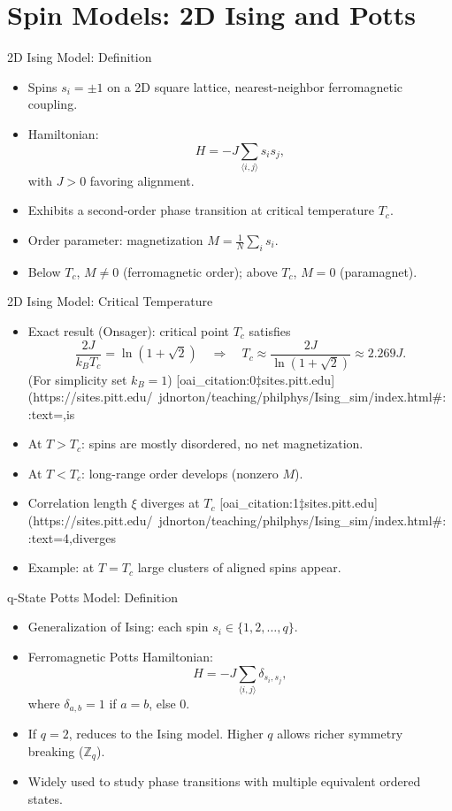 \documentclass{beamer}
\begin{document}
\section{Spin Models: 2D Ising and Potts}

\begin{frame}{2D Ising Model: Definition}
 \begin{itemize}
   \item Spins $s_i = \pm 1$ on a 2D square lattice, nearest-neighbor ferromagnetic coupling.
   \item Hamiltonian:
     \[
       H = -J \sum_{\langle i,j\rangle} s_i s_j,
     \]
     with $J>0$ favoring alignment.
   \item Exhibits a second-order phase transition at critical temperature $T_c$.
   \item Order parameter: magnetization $M = \frac{1}{N}\sum_i s_i$.
   \item Below $T_c$, $M\neq0$ (ferromagnetic order); above $T_c$, $M=0$ (paramagnet).
 \end{itemize}
\end{frame}

\begin{frame}{2D Ising Model: Critical Temperature}
 \begin{itemize}
   \item Exact result (Onsager): critical point $T_c$ satisfies
     \[
       \frac{2J}{k_B T_c} = \ln(1+\sqrt{2}) \quad\Rightarrow\quad T_c \approx \frac{2J}{\ln(1+\sqrt{2})}\approx 2.269J.
     \]
     (For simplicity set $k_B=1$) [oai_citation:0‡sites.pitt.edu](https://sites.pitt.edu/~jdnorton/teaching/philphys/Ising_sim/index.html#:~:text=,is%
   \item At $T>T_c$: spins are mostly disordered, no net magnetization.
   \item At $T<T_c$: long-range order develops (nonzero $M$).
   \item Correlation length $\xi$ diverges at $T_c$ [oai_citation:1‡sites.pitt.edu](https://sites.pitt.edu/~jdnorton/teaching/philphys/Ising_sim/index.html#:~:text=4,diverges%
   \item Example: at $T=T_c$ large clusters of aligned spins appear.
 \end{itemize}
\end{frame}

\begin{frame}{q-State Potts Model: Definition}
 \begin{itemize}
   \item Generalization of Ising: each spin $s_i \in \{1,2,\dots,q\}$.
   \item Ferromagnetic Potts Hamiltonian:
     \[
       H = -J \sum_{\langle i,j\rangle} \delta_{s_i,s_j},
     \]
     where $\delta_{a,b}=1$ if $a=b$, else $0$.
   \item If $q=2$, reduces to the Ising model. Higher $q$ allows richer symmetry breaking ($\mathbb{Z}_q$).
   \item Widely used to study phase transitions with multiple equivalent ordered states.
 \end{itemize}
\end{frame}
\end{document}
